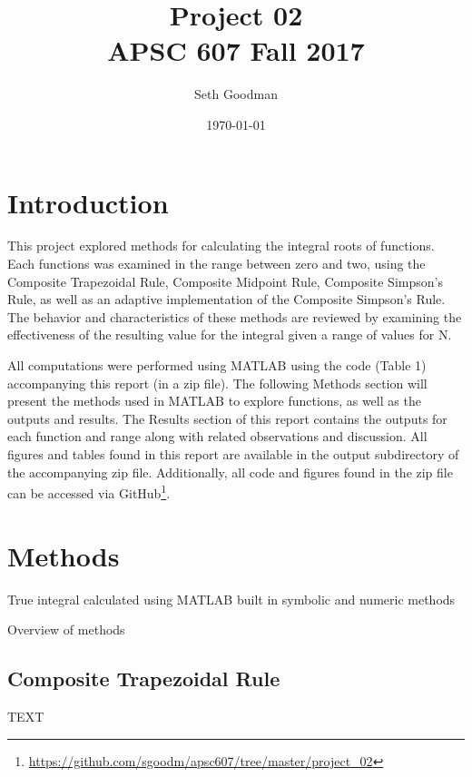 \documentclass[a4paper]{article}
\title{
	Project 02 \\
	\bigskip
	\normalsize APSC 607 Fall 2017
}
\author{Seth Goodman}
\date{\today}
\begin{document}
\maketitle



\section{Introduction}
\label{sec:introduction}


This project explored methods for calculating the integral roots of functions. Each functions was  examined in the range between zero and two, using the Composite Trapezoidal Rule, Composite Midpoint Rule, Composite Simpson’s Rule, as well as an adaptive implementation of the Composite Simpson’s Rule. The behavior and characteristics of these methods are reviewed by examining the effectiveness of the resulting value for the integral given a range of values for N. 

All computations were performed using MATLAB using the code (Table 1) accompanying this report (in a zip file). The following Methods section will present the methods used in MATLAB to explore functions, as well as the outputs and results. The Results section of this report contains the outputs for each function and range along with related observations and discussion. All figures and tables found in this report are available in the output subdirectory of the accompanying zip file. Additionally, all code and figures found in the zip file can be accessed via GitHub\footnote{\url{https://github.com/sgoodm/apsc607/tree/master/project_02}}.



\newpage
\section{Methods}
\label{sec:methods}

True integral calculated using MATLAB built in symbolic and numeric methods

Overview of methods



\subsection{Composite Trapezoidal Rule}
TEXT
\end{document}
